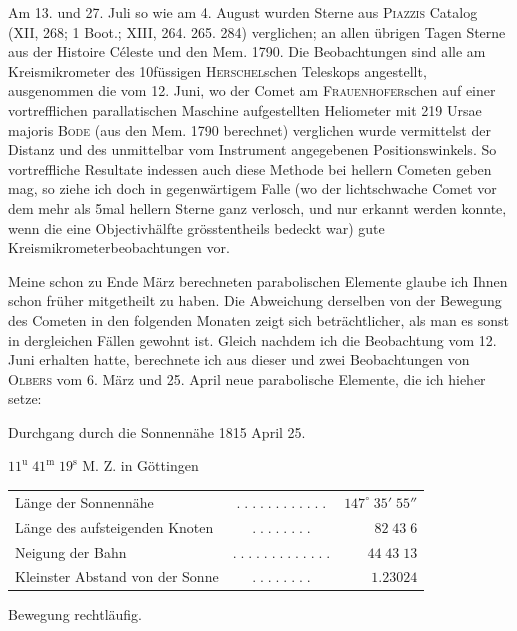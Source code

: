 \par\indent Am 13. und 27. Juli so wie am 4. August wurden Sterne aus \textsc{Piazzis} Catalog (XII, 268; 1 Boot.;
XIII, 264. 265. 284) verglichen; an allen übrigen Tagen Sterne aus der Histoire Céleste und den
Mem. 1790. Die Beobachtungen sind alle am Kreismikrometer des 10füssigen \textsc{Herschel}schen Teleskops
angestellt, ausgenommen die vom 12. Juni, wo der Comet am \textsc{Frauenhofer}schen auf einer
vortrefflichen parallatischen Maschine aufgestellten Heliometer mit 219 Ursae majoris \textsc{Bode} (aus
den Mem. 1790 berechnet) verglichen wurde vermittelst der Distanz und des unmittelbar vom
Instrument angegebenen Positionswinkels. So vortreffliche Resultate indessen auch diese Methode
bei hellern Cometen geben mag, so ziehe ich doch in gegenwärtigem Falle (wo der lichtschwache
Comet vor dem mehr als 5mal hellern Sterne ganz verlosch, und nur erkannt werden konnte, wenn die
eine Objectivhälfte grösstentheils bedeckt war) gute Kreismikrometerbeobachtungen vor.

\par\indent Meine schon zu Ende März berechneten parabolischen Elemente glaube ich Ihnen schon früher
mitgetheilt zu haben. Die Abweichung derselben von der Bewegung des Cometen in den folgenden
Monaten zeigt sich beträchtlicher, als man es sonst in dergleichen Fällen gewohnt ist. Gleich
nachdem ich die Beobachtung vom 12. Juni erhalten hatte, berechnete ich aus dieser und zwei
Beobachtungen von \textsc{Olbers} vom 6. März und 25. April neue parabolische Elemente, die ich hieher
setze:

\begin{center}\fontsize{10}{12}\selectfont Durchgang durch die Sonnennähe 1815 April 25.\par $11^{\mathrm u}\;41^{\mathrm m}\;19^{\mathrm s}$ M. Z. in Göttingen\end{center}
\begin{center}\fontsize{9}{11}\selectfont\setlength{\tabcolsep}{2pt}\renewcommand{\arraystretch}{1.15}\begin{tabular}{lcr}
Länge der Sonnennähe & $.\;.\;.\;.\;.\;.\;.\;.\;.\;.\;.\;.$ & $147^\circ\;35'\;55''$\\
Länge des aufsteigenden Knoten & $.\;.\;.\;.\;.\;.\;.\;.$ & $82\;43\;6$\\
Neigung der Bahn & $.\;.\;.\;.\;.\;.\;.\;.\;.\;.\;.\;.\;.$ & $44\;43\;13$\\
Kleinster Abstand von der Sonne & $.\;.\;.\;.\;.\;.\;.\;.$ & $1.23024$\\
\end{tabular}\end{center}\begin{center}Bewegung rechtläufig.\end{center}

